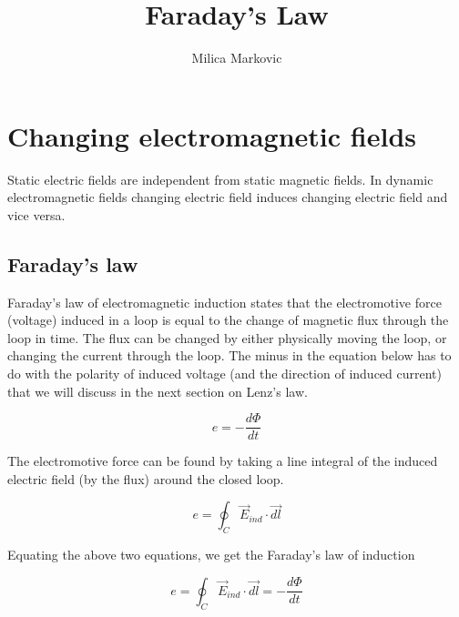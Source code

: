 \documentclass{ximera}
\title{Faraday's Law}
\author{Milica Markovic}
\begin{document}
  
\begin{abstract}  

\end{abstract}  
\maketitle    


\section{Changing electromagnetic fields}

 Static electric fields are independent from static magnetic fields. In dynamic electromagnetic fields changing electric field induces changing electric field and vice versa. 



\subsection{Faraday's law}

Faraday's law of electromagnetic induction states that the electromotive force (voltage) induced in a loop is equal to the change of magnetic flux through the loop in time. The flux can be changed by either physically moving the loop, or changing the current through the loop. The minus in the equation below has to do with the polarity of induced voltage (and the direction of induced current)  that we will discuss in the next section on Lenz's law.

\begin{equation}
e=-\frac{d\Phi}{dt}
\end{equation}

The electromotive force can be found by taking a line integral of the induced electric field (by the flux) around the closed loop.

\begin{equation}
e=\oint_C \vec{E}_{ind} \cdot \vec{dl}
\end{equation}


Equating the above two equations, we get the Faraday's law of induction


\begin{equation}
e=\oint_C \vec{E}_{ind} \cdot \vec{dl} =-\frac{d\Phi}{dt}
\end{equation}
\end{document}
